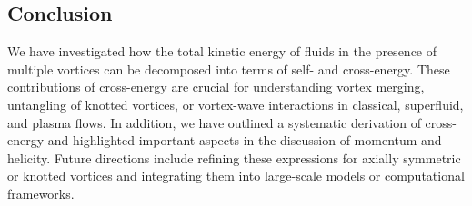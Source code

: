 \subsection*{Conclusion}
We have investigated how the total kinetic energy of fluids in the presence of multiple
vortices can be decomposed into terms of self- and cross-energy. These contributions of cross-energy
are crucial for understanding vortex merging, untangling of knotted vortices, or vortex-wave interactions in classical, superfluid, and plasma flows. In addition, we have outlined a systematic derivation of cross-energy and
highlighted important aspects in the discussion of momentum and helicity. Future directions
include refining these expressions for axially symmetric or knotted vortices and
integrating them into large-scale models or computational frameworks.